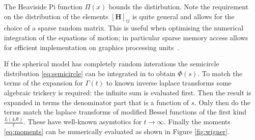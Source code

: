 \documentclass{article}[12pt]
\numberwithin{equation}{section}
\begin{document}
The Heaviside Pi function $\Pi(x)$ bounds the distirbution. Note
the requirement on the distribution of the elements $[\mathbf{H}]_{ij}$
is quite general and allows for the choice of a sparse random matrix. This is
useful when optimising the numerical integration of the equations of motion; in
particular sparse memory access allows for efficient implementation on graphics
processing units~\cite{}.

If the spherical model has completely random interations the semicircle
distribution \eqref{eq:semicircle} can be integrated in to obtain $\Phi(s)$.
To match the terms of the expansion for $\Gamma(t)$ to known inverse laplace
transforms some algebraic trickery is required: the infinite sum is evaluated first.
Then the result is expanded in terms the denominator part that is a function of $s$.
Only then do the terms match the laplace transforms of modified Bessel functions
of the first kind $\frac{I_{l}(4Jt)}{t}$. These have well-known asymtotics for
$t\rightarrow\infty$. Finally the moments \eqref{eq:moments} can be numerically
evaluated as shown in Figure \ref{fig:wigner}.
\end{document}
